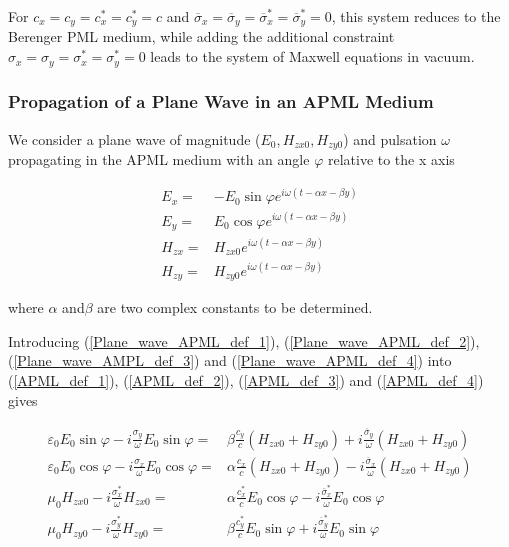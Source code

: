 For $c_{x}=c_{y}=c^{*}_{x}=c^{*}_{y}=c$ and $\overline{\sigma }_{x}=\overline{\sigma }_{y}=\overline{\sigma }_{x}^{*}=\overline{\sigma }_{y}^{*}=0$,
this system reduces to the Berenger PML medium, while adding the additional
constraint $\sigma _{x}=\sigma _{y}=\sigma _{x}^{*}=\sigma _{y}^{*}=0$
leads to the system of Maxwell equations in vacuum.

\subsubsection{\label{Sec:analytic theory, propa plane wave}Propagation of a Plane Wave in an APML Medium}

We consider a plane wave of magnitude ($ E_{0},H_{zx0},H_{zy0} $)
and pulsation $\omega$ propagating in the APML medium with an
angle $\varphi$ relative to the x axis

\begin{eqnarray}
E_{x} = & -E_{0}\sin \varphi e^{i\omega \left( t-\alpha x-\beta y\right) }\label{Plane_wave_APML_def_1} \\
E_{y} = & E_{0}\cos \varphi e^{i\omega \left( t-\alpha x-\beta y\right) }\label{Plane_wave_APML_def_2} \\
H_{zx} = & H_{zx0}e^{i\omega \left( t-\alpha x-\beta y\right) }\label{Plane_wave_AMPL_def_3} \\
H_{zy} = & H_{zy0}e^{i\omega \left( t-\alpha x-\beta y\right) }\label{Plane_wave_APML_def_4}
\end{eqnarray}


where $\alpha$ and$\beta$ are two complex constants to
be determined.

Introducing (\ref{Plane_wave_APML_def_1}), (\ref{Plane_wave_APML_def_2}),
(\ref{Plane_wave_AMPL_def_3}) and (\ref{Plane_wave_APML_def_4})
into (\ref{APML_def_1}), (\ref{APML_def_2}), (\ref{APML_def_3})
and (\ref{APML_def_4}) gives

\begin{eqnarray}
\varepsilon _{0}E_{0}\sin \varphi -i\frac{\sigma _{y}}{\omega }E_{0}\sin \varphi  = & \beta \frac{c_{y}}{c}\left( H_{zx0}+H_{zy0}\right) +i\frac{\overline{\sigma }_{y}}{\omega }\left( H_{zx0}+H_{zy0}\right) \label{Plane_wave_APML_1_1} \\
\varepsilon _{0}E_{0}\cos \varphi -i\frac{\sigma _{x}}{\omega }E_{0}\cos \varphi  = & \alpha \frac{c_{x}}{c}\left( H_{zx0}+H_{zy0}\right) -i\frac{\overline{\sigma }_{x}}{\omega }\left( H_{zx0}+H_{zy0}\right) \label{Plane_wave_APML_1_2} \\
\mu _{0}H_{zx0}-i\frac{\sigma ^{*}_{x}}{\omega }H_{zx0} = & \alpha \frac{c^{*}_{x}}{c}E_{0}\cos \varphi -i\frac{\overline{\sigma }^{*}_{x}}{\omega }E_{0}\cos \varphi \label{Plane_wave_APML_1_3} \\
\mu _{0}H_{zy0}-i\frac{\sigma ^{*}_{y}}{\omega }H_{zy0} = & \beta \frac{c^{*}_{y}}{c}E_{0}\sin \varphi +i\frac{\overline{\sigma }^{*}_{y}}{\omega }E_{0}\sin \varphi \label{Plane_wave_APML_1_4}
\end{eqnarray}


